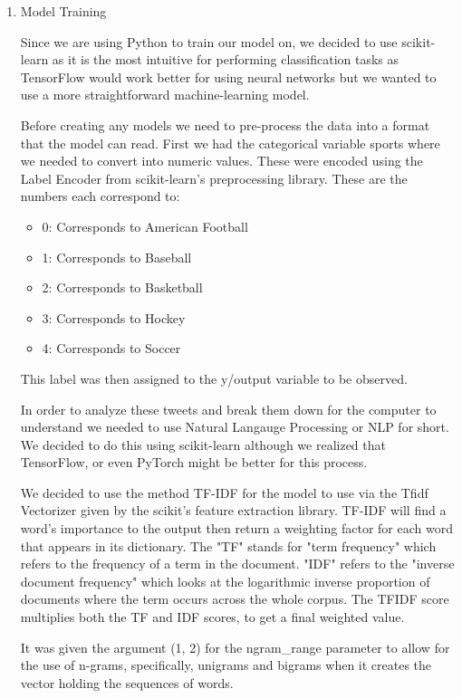 \documentclass{article}
\begin{document}
\begin{enumerate}
\begin{itemize}
    \end{itemize}
    
    \item Model Training

    Since we are using Python to train our model on, we decided to use scikit-learn as it is the most intuitive for performing classification tasks as TensorFlow would work better for using neural networks but we wanted to use a more straightforward machine-learning model.
    
    Before creating any models we need to pre-process the data into a format that the model can read. First we had the categorical variable sports where we needed to convert into numeric values. These were encoded using the Label Encoder from scikit-learn's preprocessing library. 
    These are the numbers each correspond to:
    \begin{itemize}
    \item 0: Corresponds to American Football
    \item 1: Corresponds to Baseball
    \item 2: Corresponds to Basketball
    \item 3: Corresponds to Hockey
    \item 4: Corresponds to Soccer
    \end{itemize}

    This label was then assigned to the y/output variable to be observed. 

    In order to analyze these tweets and break them down for the computer to understand we needed to use Natural Langauge Processing or NLP for short.
    We decided to do this using scikit-learn although we realized that TensorFlow, or even PyTorch might be better for this process.

    We decided to use the method TF-IDF for the model to use via the Tfidf Vectorizer given by the scikit's feature extraction library. TF-IDF will find a word's importance to the output then return a weighting factor for each word that appears in its dictionary.
    The "TF" stands for "term frequency" which refers to the frequency of a term in the document. "IDF" refers to the "inverse document frequency" which looks at the logarithmic inverse proportion of documents where the term occurs across the whole corpus. The TFIDF score multiplies both the TF and IDF scores, to get a final weighted value.
    
    It was given the argument (1, 2) for the ngram\_range parameter to allow for the use of n-grams, specifically, unigrams and bigrams when it creates the vector holding the sequences of words.


\end{enumerate}
\end{document}
